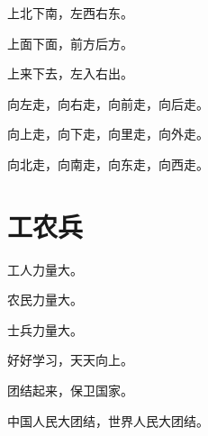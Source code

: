 \documentclass[12pt,UTF-8,openany]{ctexbook}
\begin{document}
\begin{large}
    
    上北下南，左西右东。
    
    上面下面，前方后方。
    
    上来下去，左入右出。
    
    向左走，向右走，向前走，向后走。
    
    向上走，向下走，向里走，向外走。
    
    向北走，向南走，向东走，向西走。
    
\end{large}


\clearpage

\begin{center}
    
\end{center}


\hanzibox{}\hanzibox{}\hanzibox{}\hanzibox{}\hspace{1em}\hanzibox{}\hanzibox{}\hanzibox{}\hanzibox{}

\hanzibox{}\hanzibox{}\hanzibox{}\hanzibox{}\hspace{1em}\hanzibox{}\hanzibox{}\hanzibox{}\hanzibox{}

\hanzibox{}\hanzibox{}\hanzibox{}\hanzibox{}\hspace{1em}\hanzibox{}\hanzibox{}\hanzibox{}\hanzibox{}






\chapter{工农兵}

\begin{large}
    
    工人力量大。
    
    农民力量大。
    
    士兵力量大。
    
    好好学习，天天向上。
    
    团结起来，保卫国家。
    
    中国人民大团结，世界人民大团结。
    
\end{large}


\clearpage

\begin{center}
    
    
\end{center}
\end{document}
